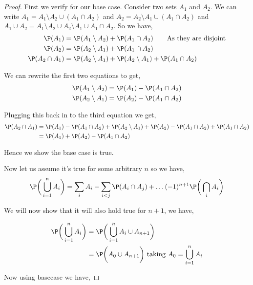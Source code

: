 \documentclass[a4paper]{report}
\begin{document}
\begin{proof}
    
First we verify for our base case. Consider two sets $A_1$ and $A_2$. We can write $A_1 = A_1 \setminus A_2 \cup (A_1 \cap A_2)$ and $A_2 = A_2 \setminus A_1 \cup (A_1 \cap A_2)$ and $A_1 \cup A_2 = A_1 \setminus A_2 \cup A_2 \setminus A_1 \cup A_1 \cap A_2$. So we have, 
\begin{align*}
    \P(A_1) &= \P(A_1 \setminus A_2) + \P(A_1 \cap A_2) \qquad \text{As they are disjoint}\\
    \P(A_2) &= \P(A_2 \setminus A_1) + \P(A_1 \cap A_2) \\
    \P(A_2 \cap A_1) &= \P(A_2 \setminus A_1) + \P(A_2 \setminus A_1) + \P(A_1 \cap A_2) 
\end{align*}


We can rewrite the first two equations to get, 
\begin{align*}
 \P(A_1 \setminus A_2)&=  \P(A_1) - \P(A_1 \cap A_2)\\
 \P(A_2 \setminus A_1)&=  \P(A_2) - \P(A_1 \cap A_2)\\
\end{align*}

Plugging this back in to the third equation we get, 
\begin{align*}
    \P(A_2 \cap A_1) &= \P(A_1) - \P(A_1 \cap A_2) + \P(A_2 \setminus A_1) +   \P(A_2) - \P(A_1 \cap A_2)+ \P(A_1 \cap A_2) \\
                     &= \P(A_1) + \P(A_2) - \P(A_1 \cap A_2)
\end{align*}

Hence we show the base case is true.

Now let us assume it's true for some arbitrary $n$ so we have,  
$$ \P \bigg (  \bigcup_{i = 1}^{n} A_i \bigg )  = \sum_{i} A_i  -\sum_{i < j} \P(A_i \cap A_j) + \dots (-1)^{n + 1} \P\bigg (\bigcap_i A_i \bigg )$$ 

We will now show that it will also hold true for $n + 1$, we have, 

\begin{align*}
    \P \bigg (  \bigcup_{i = 1}^{n} A_i \bigg )  &=     \P \bigg (  \bigcup_{i = 1}^{n} A_i  \cup A_{n + 1}\bigg ) \\
                                                 &=    \P \bigg (  A_0  \cup A_{n + 1}\bigg ) \text{ taking $A_0 =  \bigcup_{i = 1}^{n} A_i$}\\
\end{align*}

Now using basecase we have, 


\end{proof}
\end{document}
